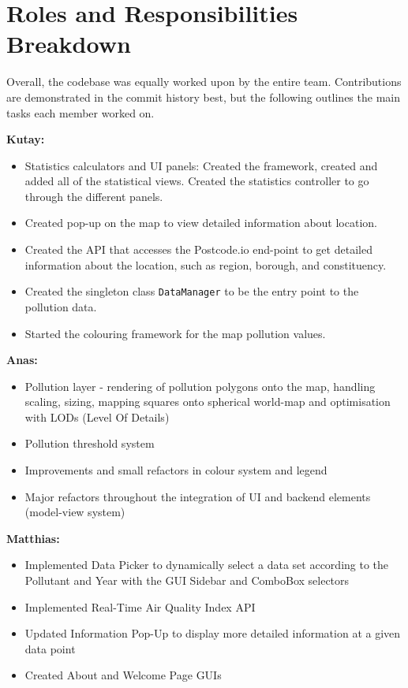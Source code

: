 \documentclass[../main.tex]{subfiles}
\begin{document}
\section{Roles and Responsibilities Breakdown}

\noindent Overall, the codebase was equally worked upon by the entire team. Contributions are demonstrated in the commit history best, but the following outlines the main tasks each member worked on.

\noindent \textbf{Kutay:}
\begin{itemize}
    \itemsep-0.2em 
    \item Statistics calculators and UI panels: Created the framework, created and added all of the statistical views. Created the statistics controller to go through the different panels.
    \item Created pop-up on the map to view detailed information about location.
    \item Created the API that accesses the Postcode.io end-point to get detailed information about the location, such as region, borough, and constituency.
    \item Created the singleton class \verb|DataManager| to be the entry point to the pollution data.
    \item Started the colouring framework for the map pollution values.
\end{itemize}

\noindent \textbf{Anas:}
\begin{itemize}
    \itemsep0em 
    \item Pollution layer - rendering of pollution polygons onto the map, handling scaling, sizing, mapping squares onto spherical world-map and optimisation with LODs (Level Of Details)
    \item Pollution threshold system
    \item Improvements and small refactors in colour system and legend 
    \item Major refactors throughout the integration of UI and backend elements (model-view system)
\end{itemize}

\noindent \textbf{Matthias:}
\begin{itemize}
    \itemsep0em 
    \item Implemented Data Picker to dynamically select a data set according to the Pollutant and Year with the GUI Sidebar and ComboBox selectors
    \item Implemented Real-Time Air Quality Index API
    \item Updated Information Pop-Up to display more detailed information at a given data point
    \item Created About and Welcome Page GUIs 
\end{itemize}
\end{document}
